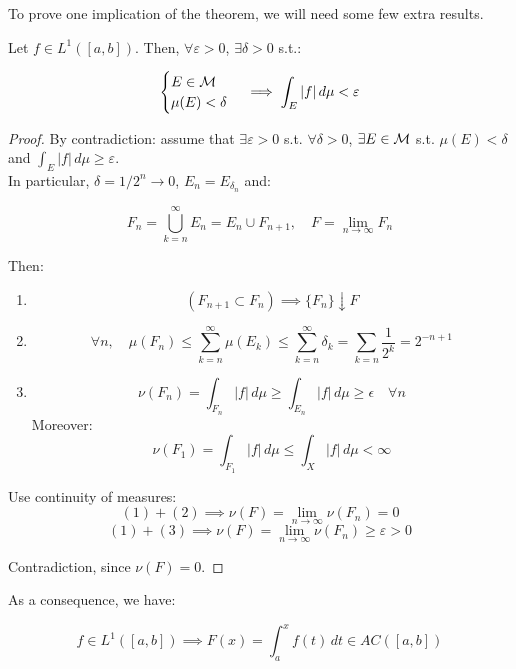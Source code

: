 \begin{note}
    To prove one implication of the theorem, we will need some few extra 
    results.
\end{note}

\vspace{1em}

\begin{ftheorem}
    Let $f \in L^1([a, b])$. Then, $\forall \varepsilon > 0$, $\exists \delta > 0$ s.t.:

    $$\begin{cases}
        E \in \mathcal{M}\\
        \mu(E) < \delta
    \end{cases} \implies \int_{E} |f| \, d\mu < \varepsilon$$
    
\end{ftheorem}

\begin{proof}
    By contradiction: assume that $\exists \varepsilon > 0$ s.t. $\forall \delta > 0$,
    $\exists E \in \mathcal{M}$ s.t. $\mu(E) < \delta$ and $\int_E |f| \, d\mu \geq \varepsilon$.\\

    In particular, $\delta = 1/2^n \to 0$, $E_n = E_{\delta_n}$ and:

    $$F_n = \bigcup_{k=n}^{\infty} E_n = E_n \cup F_{n+1}, \quad F = \lim_{n \to \infty} F_n$$

    Then:
    \begin{enumerate}
        \item $$(F_{n+1} \subset F_n) \implies \{F_n\} \downarrow F$$
        \item $$\forall n, \quad  \mu(F_n) \leq \sum_{k=n}^{\infty} \mu(E_k) \leq \sum_{k=n}^{\infty} \delta_k = \sum_{k=n} \frac{1}{2^k} = 2^{-n+1}$$
        \item $$\nu(F_n) = \int_{F_n} |f| \, d\mu \geq \int_{E_n} |f| \, d\mu \geq \epsilon \quad \forall n$$
        Moreover:
        $$\nu(F_1) = \int_{F_1} |f| \, d\mu \leq \int_X |f| \, d\mu < \infty$$
    \end{enumerate}

    Use continuity of measures:
    $$(1) + (2) \implies \nu(F) = \lim_{n \to \infty} \nu(F_n) = 0$$
    $$(1) + (3) \implies \nu(F) = \lim_{n \to \infty} \nu(F_n) \geq \varepsilon > 0$$

    Contradiction, since $\nu(F) = 0$.
\end{proof}

\begin{fremark}
    As a consequence, we have:

    $$f \in L^1([a, b]) \implies F(x) = \int_a^x f(t) \, dt \in AC([a, b])$$
\end{fremark}

